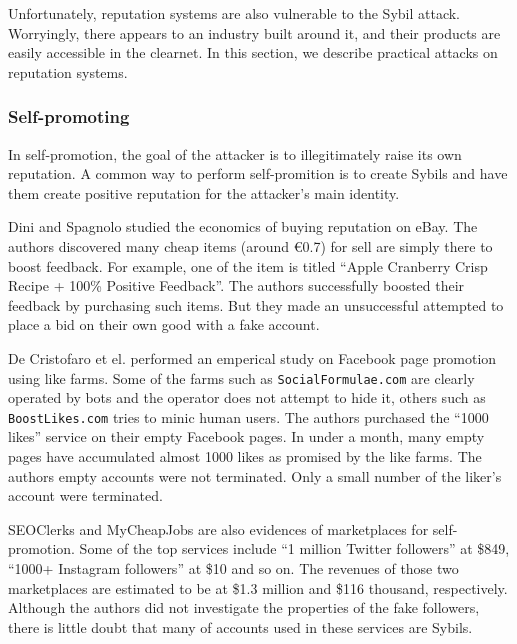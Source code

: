 Unfortunately, reputation systems are also vulnerable to the Sybil attack.
Worryingly, there appears to an industry built around it, and their products are
easily accessible in the clearnet. In this section, we describe practical
attacks on reputation systems.

\subsubsection{Self-promoting}
In self-promotion, the goal of the attacker is to illegitimately raise its own
reputation. A common way to perform self-promition is to create Sybils and have
them create positive reputation for the attacker's main identity.

Dini and Spagnolo studied the economics of buying reputation on eBay. The
authors discovered many cheap items (around \euro{0.7}) for sell are simply there to
boost feedback. For example, one of the item is titled ``Apple Cranberry Crisp
Recipe + 100\% Positive Feedback''. The authors successfully boosted their
feedback by purchasing such items. But they made an unsuccessful attempted to
place a bid on their own good with a fake account\cite{dini2009buying}.


De Cristofaro et el. performed an emperical study on Facebook page promotion
using like farms\cite{de2014paying}. Some of the farms such as
\verb!SocialFormulae.com! are clearly operated by bots and the operator does not
attempt to hide it, others such as \verb!BoostLikes.com! tries to minic human
users. The authors purchased the ``1000 likes'' service on their empty Facebook pages.
In under a month, many empty pages have accumulated almost 1000 likes as
promised by the like farms. The authors empty accounts were not terminated. Only
a small number of the liker's account were terminated.


SEOClerks and MyCheapJobs are also evidences of marketplaces for self-promotion.
Some of the top services include ``1 million Twitter followers'' at \$849,
``1000+ Instagram followers'' at \$10 and so on. The revenues of those two
marketplaces are estimated to be at \$1.3 million and \$116 thousand,
respectively\cite{farooqi2015characterizing}. Although the authors did not
investigate the properties of the fake followers, there is little doubt that
many of accounts used in these services are Sybils.

